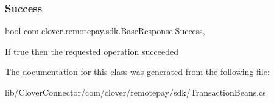 \mbox{\label{classcom_1_1clover_1_1remotepay_1_1sdk_1_1_base_response_a26eb8731f844ac210c003aef421edcb0}} 
\subsubsection{\texorpdfstring{Success}{Success}}
{\footnotesize\ttfamily bool com.\+clover.\+remotepay.\+sdk.\+Base\+Response.\+Success\hspace{0.3cm}{\ttfamily [get]}, {\ttfamily [set]}}



If true then the requested operation succeeded 



The documentation for this class was generated from the following file\+:\begin{DoxyCompactItemize}
\item 
lib/\+Clover\+Connector/com/clover/remotepay/sdk/Transaction\+Beans.\+cs\end{DoxyCompactItemize}
